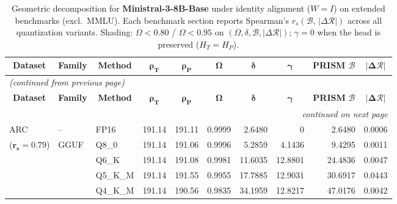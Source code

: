 \begingroup
\small
\setlength{\tabcolsep}{4pt}
\renewcommand{\arraystretch}{1.05}
\setlength{\LTcapwidth}{\textwidth}
\begin{longtable}{ll l rrrrrrr}
\caption{Geometric decomposition for \textbf{Ministral-3-8B-Base} under identity alignment ($W{=}I$) on extended benchmarks (excl.\ MMLU). Each benchmark section reports Spearman's $r_s(\mathcal{B},\,|\Delta\mathcal{R}|)$ across all quantization variants. Shading: \colorbox{red!35}{$\Omega{<}0.80$} / \colorbox{red!18}{$\Omega{<}0.95$} on $(\Omega,\delta,\mathcal{B},|\Delta\mathcal{R}|)$; \colorbox{cyan!12}{$\gamma{=}0$} when the head is preserved ($H_T{=}H_P$).}\label{tab:mistral_decomposition_ext_bound}\\
\toprule
\multicolumn{1}{c}{\textbf{Dataset}} & \multicolumn{1}{c}{\textbf{Family}} & \multicolumn{1}{c}{\textbf{Method}} & \multicolumn{1}{c}{$\boldsymbol{\rho_T}$} & \multicolumn{1}{c}{$\boldsymbol{\rho_P}$} & \multicolumn{1}{c}{$\boldsymbol{\Omega}$} & \multicolumn{1}{c}{$\boldsymbol{\delta}$} & \multicolumn{1}{c}{$\boldsymbol{\gamma}$} & \multicolumn{1}{c}{\textbf{PRISM} $\boldsymbol{\mathcal{B}}$} & \multicolumn{1}{c}{$\boldsymbol{|\Delta\mathcal{R}|}$} \\
\midrule
\endfirsthead
\multicolumn{10}{l}{\small\itshape (continued from previous page)}\\
\toprule
\multicolumn{1}{c}{\textbf{Dataset}} & \multicolumn{1}{c}{\textbf{Family}} & \multicolumn{1}{c}{\textbf{Method}} & \multicolumn{1}{c}{$\boldsymbol{\rho_T}$} & \multicolumn{1}{c}{$\boldsymbol{\rho_P}$} & \multicolumn{1}{c}{$\boldsymbol{\Omega}$} & \multicolumn{1}{c}{$\boldsymbol{\delta}$} & \multicolumn{1}{c}{$\boldsymbol{\gamma}$} & \multicolumn{1}{c}{\textbf{PRISM} $\boldsymbol{\mathcal{B}}$} & \multicolumn{1}{c}{$\boldsymbol{|\Delta\mathcal{R}|}$} \\
\midrule
\endhead
\midrule
\multicolumn{10}{r}{\small\itshape continued on next page}\\
\endfoot
\bottomrule
\endlastfoot
ARC & -- & FP16 & 191.14 & 191.11 & 0.9999 & 2.6480 & \cellcolor{cyan!12} $0$ & 2.6480 & 0.0006 \\
{\small ($\mathbf{r_s{=}0.79}$)} & GGUF & Q8\_0 & 191.14 & 191.06 & 0.9996 & 5.2859 & 4.1436 & 9.4295 & 0.0011 \\
 &  & Q6\_K & 191.14 & 191.08 & 0.9981 & 11.6035 & 12.8801 & 24.4836 & 0.0047 \\
 &  & Q5\_K\_M & 191.14 & 191.55 & 0.9955 & 17.7885 & 12.9031 & 30.6917 & 0.0443 \\
 &  & Q4\_K\_M & 191.14 & 190.56 & 0.9835 & 34.1959 & 12.8217 & 47.0176 & 0.0042 \\

\end{longtable}
